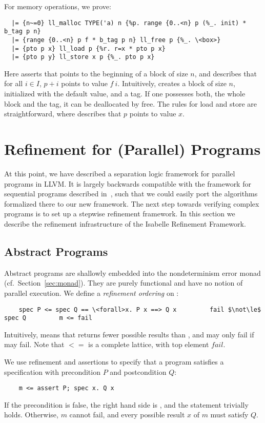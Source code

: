 \documentclass[sn-mathphys,Numbered]{sn-jnl}
\theoremstyle{thmstyleone}%
\theoremstyle{definition}%
\theoremstyle{thmstylethree}%
\begin{document}
  For memory operations, we prove:
  \begin{lstlisting}
  |= {n~=0} ll_malloc TYPE('a) n {%p. range {0..<n} p (%_. init) * b_tag p n}
  |= {range {0..<n} p f * b_tag p n} ll_free p {%_. \<box>}
  |= {pto p x} ll_load p {%r. r=x * pto p x}
  |= {pto p y} ll_store x p {%_. pto p x}
  \end{lstlisting}
  Here  asserts that  points to the beginning of a block of size \is$n$, and
   describes that for all $i\in I$, $p+i$ points to value $f~i$.
  Intuitively,  creates a block of size $n$, initialized with the default  value,
  and a tag. If one possesses both, the whole block and the tag, it can be deallocated by free.
  The rules for load and store are straightforward, where  describes that $p$ points to value $x$.


  \section{Refinement for (Parallel) Programs}\label{sec:refine_parallel}
  At this point, we have described a separation logic framework for parallel programs in LLVM.
  It is largely backwards compatible with the framework for sequential programs described in~\cite{La19-llvm},
  such that we could easily port the algorithms formalized there to our new framework.
  The next step towards verifying complex programs is to set up a stepwise refinement framework.
  In this section we describe the refinement infrastructure of the
  Isabelle Refinement Framework.

  \subsection{Abstract Programs}
  Abstract programs are shallowly embedded into the nondeterminism error monad  (cf.\ Section~\ref{sec:monad}).
  They are purely functional and have no notion of parallel execution.
  We define a \emph{refinement ordering} on :
  \begin{lstlisting}
    spec P <= spec Q == \<forall>x. P x ==> Q x         fail $\not\le$ spec Q         m <= fail
  \end{lstlisting}
  Intuitively,  means
  that  returns fewer possible results than , and may only fail if  may fail.
  Note that \is$<=$ is a complete lattice, with top element \is$fail$.

  We use refinement and assertions to
  specify that a program  satisfies a specification with precondition \is$P$ and postcondition \is$Q$:
  \begin{lstlisting}
    m <= assert P; spec x. Q x
  \end{lstlisting}
  If the precondition is false, the right hand side is , and the statement trivially holds.
  Otherwise, $m$ cannot fail, and every possible result $x$ of $m$ must satisfy $Q$.
\end{document}
